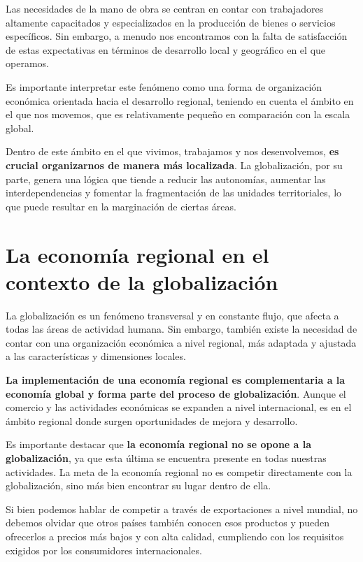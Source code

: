 \documentclass[
  a4paper,
]{article}
\begin{document}
Las necesidades de la mano de obra se centran en contar con trabajadores
altamente capacitados y especializados en la producción de bienes o
servicios específicos. Sin embargo, a menudo nos encontramos con la
falta de satisfacción de estas expectativas en términos de desarrollo
local y geográfico en el que operamos.

Es importante interpretar este fenómeno como una forma de organización
económica orientada hacia el desarrollo regional, teniendo en cuenta el
ámbito en el que nos movemos, que es relativamente pequeño en
comparación con la escala global.

Dentro de este ámbito en el que vivimos, trabajamos y nos desenvolvemos,
\textbf{es crucial organizarnos de manera más localizada}. La
globalización, por su parte, genera una lógica que tiende a reducir las
autonomías, aumentar las interdependencias y fomentar la fragmentación
de las unidades territoriales, lo que puede resultar en la marginación
de ciertas áreas.

\section{La economía regional en el contexto de la
globalización}\label{la-economuxeda-regional-en-el-contexto-de-la-globalizaciuxf3n}

La globalización es un fenómeno transversal y en constante flujo, que
afecta a todas las áreas de actividad humana. Sin embargo, también
existe la necesidad de contar con una organización económica a nivel
regional, más adaptada y ajustada a las características y dimensiones
locales.

\textbf{La implementación de una economía regional es complementaria a
la economía global y forma parte del proceso de globalización}. Aunque
el comercio y las actividades económicas se expanden a nivel
internacional, es en el ámbito regional donde surgen oportunidades de
mejora y desarrollo.

Es importante destacar que \textbf{la economía regional no se opone a la
globalización}, ya que esta última se encuentra presente en todas
nuestras actividades. La meta de la economía regional no es competir
directamente con la globalización, sino más bien encontrar su lugar
dentro de ella.

Si bien podemos hablar de competir a través de exportaciones a nivel
mundial, no debemos olvidar que otros países también conocen esos
productos y pueden ofrecerlos a precios más bajos y con alta calidad,
cumpliendo con los requisitos exigidos por los consumidores
internacionales.
\end{document}

